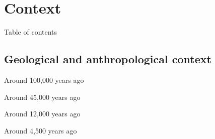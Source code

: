 \documentclass[10pt,aspectratio=43]{beamer}
\begin{document}
\section{Context}
\begin{frame}{}{Table of contents}
\tableofcontents[currentsection, subsubsectionstyle=hide]
\end{frame}

\subsection{Geological and anthropological context}

\begin{frame}{}{Around 100,000 years ago}
\end{frame}

\addtocounter{framenumber}{-1}
\begin{frame}{}{Around 45,000 years ago}
\end{frame}

\addtocounter{framenumber}{-1}
\begin{frame}{}{Around 12,000 years ago}
\end{frame}

\addtocounter{framenumber}{-1}
\begin{frame}{}{Around 4,500 years ago}
\end{frame}
\end{document}
